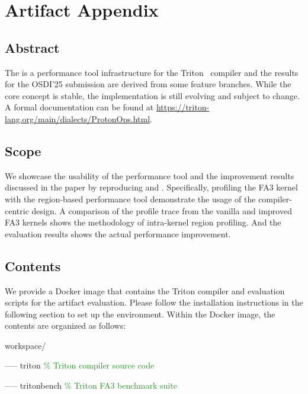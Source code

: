 \section{Artifact Appendix}

\subsection*{Abstract}


The \thiswork{}  is a performance tool infrastructure for the Triton~\cite{tillet2019triton} compiler and  the results for the OSDI'25 submission are derived from some feature branches.
While the core concept is stable, the implementation is still evolving and subject to change.
A formal documentation can be found at \url{https://triton-lang.org/main/dialects/ProtonOps.html}.

\subsection*{Scope}


We showcase the usability of the performance tool and the improvement results discussed in the paper by reproducing \Fig{\ref{fig:fa3_trace}} and \Fig{\ref{fig:fa3_benchmark}}.
Specifically, profiling the FA3 kernel with the region-based performance tool demonstrate the usage of the compiler-centric design.
A comparison of the profile trace from the vanilla and improved FA3 kernels shows the methodology of intra-kernel region profiling.
And the evaluation results shows the actual performance improvement.


\subsection*{Contents}


We provide a Docker image that contains the Triton compiler and evaluation scripts for the artifact evaluation.
Please follow the installation instructions in the following section to set up the environment.
Within the Docker image, the contents are organized as follows:

\vspace{1em}
workspace/

\quad{}----- triton               \hspace{5em} \textcolor{ForestGreen}{\% Triton compiler source code}

\quad{}----- tritonbench          \hspace{2.6em} \textcolor{ForestGreen}{\% Triton FA3 benchmark suite}

